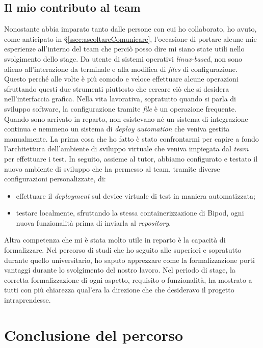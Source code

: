 \subsection{Il mio contributo al team}
Nonostante abbia imparato tanto dalle persone con cui ho collaborato, ho avuto, come anticipato in \S\ref{ssec:ascoltareComunicare}, l'occasione di portare alcune mie esperienze all'interno del team che perciò posso dire mi siano state utili nello svolgimento dello stage.
Da utente di sistemi operativi \textit{linux-based}, non sono alieno all'interazione da terminale e alla modifica di \textit{files} di configurazione. Questo perché alle volte è più comodo e veloce effettuare alcune operazioni sfruttando questi due strumenti piuttosto che cercare ciò che si desidera nell'interfaccia grafica. Nella vita lavorativa, sopratutto quando si parla di sviluppo software, la configurazione tramite \textit{file} è un operazione frequente. Quando sono arrivato in reparto, non esistevano né un sistema di integrazione continua e nemmeno un sistema di \textit{deploy automation} che veniva gestita manualmente. La prima cosa che ho fatto è stato confrontarmi per capire a fondo l'architettura dell'ambiente di sviluppo virtuale che veniva impiegata dal \textit{team} per effettuare i test.
\newpage
In seguito, assieme al tutor, abbiamo configurato e testato il nuovo ambiente di sviluppo che ha permesso al team, tramite diverse configurazioni personalizzate, di:
\begin{itemize}
    \item effettuare il \textit{deployment} sul device virtuale di test in maniera automatizzata;
    \item testare localmente, sfruttando la stessa containerizzazione di Bipod, ogni nuova funzionalità prima di inviarla al \textit{repository}.
\end{itemize}
Altra competenza che mi è stata molto utile in reparto è la capacità di formalizzare. Nel percorso di studi che ho seguito alle superiori e sopratutto durante quello universitario, ho saputo apprezzare come la formalizzazione porti vantaggi durante lo svolgimento del nostro lavoro. Nel periodo di stage, la corretta formalizzazione di ogni aspetto, requisito o funzionalità, ha mostrato a tutti con più chiarezza qual'era la direzione che che desideravo il progetto intraprendesse.
\section{Conclusione del percorso}
